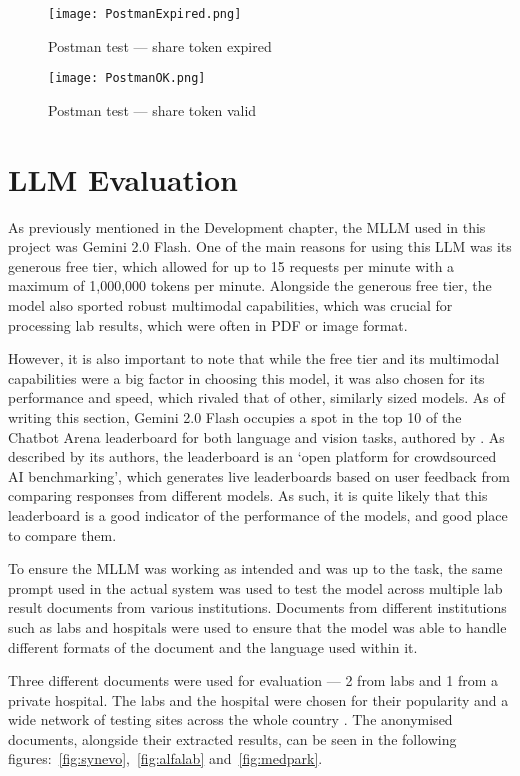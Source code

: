 \begin{figure}[htbp]
    \centering
    \texttt{[image: PostmanExpired.png]}
    \caption{Postman test --- share token expired}\label{fig:postman2}
\end{figure}

\begin{figure}[htbp]
    \centering
    \texttt{[image: PostmanOK.png]}
    \caption{Postman test --- share token valid}\label{fig:postman3}
\end{figure}

\FloatBarrier{}

\section{LLM Evaluation}

As previously mentioned in the Development chapter, the MLLM used in this project was Gemini 2.0 Flash. One of the main reasons for using this LLM was its generous free tier, which allowed for up to 15 requests per minute with a maximum of 1,000,000 tokens per minute. Alongside the generous free tier, the model also sported robust multimodal capabilities, which was crucial for processing lab results, which were often in PDF or image format. 

However, it is also important to note that while the free tier and its multimodal capabilities were a big factor in choosing this model, it was also chosen for its performance and speed, which rivaled that of other, similarly sized models. As of writing this section, Gemini 2.0 Flash occupies a spot in the top 10 of the Chatbot Arena leaderboard for both language and vision tasks, authored by \textcite{chatbotarena}. As described by its authors, the leaderboard is an `open platform for crowdsourced AI benchmarking', which generates live leaderboards based on user feedback from comparing responses from different models. As such, it is quite likely that this leaderboard is a good indicator of the performance of the models, and good place to compare them.

To ensure the MLLM was working as intended and was up to the task, the same prompt used in the actual system was used to test the model across multiple lab result documents from various institutions. Documents from different institutions such as labs and hospitals were used to ensure that the model was able to handle different formats of the document and the language used within it. 

Three different documents were used for evaluation --- 2 from labs and 1 from a private hospital. The labs and the hospital were chosen for their popularity and a wide network of testing sites across the whole country \parencite{alfalab, synevo, medpark}. The anonymised documents, alongside their extracted results, can be seen in the following figures:~\ref{fig:synevo},~\ref{fig:alfalab} and~\ref{fig:medpark}.

